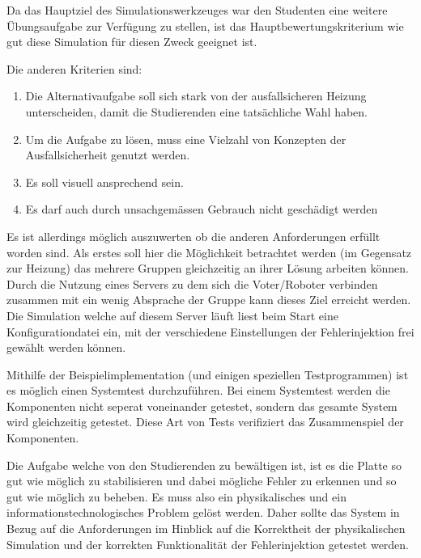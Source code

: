 {Da das Hauptziel des Simulationswerkzeuges war den Studenten eine weitere {\"{U}}bungsaufgabe zur Verf{\"{u}}gung
zu stellen, ist das Hauptbewertungskriterium wie gut diese Simulation f{\"{u}}r diesen Zweck geeignet ist.

Die anderen Kriterien sind: \todo{}

\begin{enumerate}
	\item Die Alternativaufgabe soll sich stark von der ausfallsicheren Heizung unterscheiden, damit die Studierenden eine tats{\"{a}}chliche Wahl haben.
	\item Um die Aufgabe zu l{\"{o}}sen, muss eine Vielzahl von Konzepten der Ausfallsicherheit genutzt werden.
	\item Es soll visuell ansprechend sein.
	\item Es darf auch durch unsachgem{\"{a}}ssen Gebrauch nicht gesch{\"{a}}digt werden
\end{enumerate}

Es ist allerdings m{\"{o}}glich auszuwerten ob die anderen Anforderungen erf{\"{u}}llt worden sind. Als erstes
soll hier die M{\"{o}}glichkeit betrachtet werden (im Gegensatz zur Heizung) das mehrere Gruppen gleichzeitig
an ihrer L{\"{o}}sung arbeiten k{\"{o}}nnen. Durch die Nutzung eines Servers zu dem sich die Voter/Roboter
verbinden zusammen mit ein wenig Absprache der Gruppe kann dieses Ziel erreicht werden. Die Simulation welche
auf diesem Server l{\"{a}}uft liest beim Start eine Konfigurationdatei ein, mit der verschiedene Einstellungen
der Fehlerinjektion frei gew{\"{a}}hlt werden k{\"{o}}nnen.

Mithilfe der Beispielimplementation (und einigen speziellen Testprogrammen) ist es m{\"{o}}glich einen Systemtest
durchzuf{\"{u}}hren. Bei einem Systemtest werden die Komponenten nicht seperat voneinander getestet, sondern das
gesamte System wird gleichzeitig getestet. Diese Art von Tests verifiziert das Zusammenspiel der Komponenten.

Die Aufgabe welche von den Studierenden zu bew{\"{a}}ltigen ist, ist es die Platte so gut wie m{\"{o}}glich zu
stabilisieren und dabei m{\"{o}}gliche Fehler zu erkennen und so gut wie m{\"{o}}glich zu beheben. Es muss also
ein physikalisches und ein informationstechnologisches Problem gel{\"{o}}st werden. Daher sollte das System in
Bezug auf die Anforderungen im Hinblick auf die Korrektheit der physikalischen Simulation und der korrekten
Funktionalit{\"{a}}t der Fehlerinjektion getestet werden.

}
